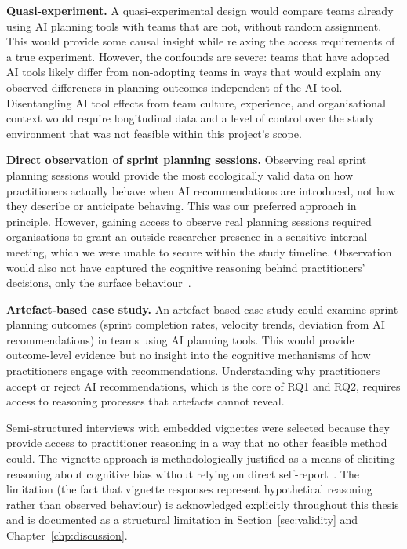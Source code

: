 \documentclass[a4paper,twoside]{bth}
\begin{document}
\textbf{Quasi-experiment.} A quasi-experimental design would compare teams already using AI planning tools with teams that are not, without random assignment. This would provide some causal insight while relaxing the access requirements of a true experiment. However, the confounds are severe: teams that have adopted AI tools likely differ from non-adopting teams in ways that would explain any observed differences in planning outcomes independent of the AI tool. Disentangling AI tool effects from team culture, experience, and organisational context would require longitudinal data and a level of control over the study environment that was not feasible within this project's scope.

\textbf{Direct observation of sprint planning sessions.} Observing real sprint planning sessions would provide the most ecologically valid data on how practitioners actually behave when AI recommendations are introduced, not how they describe or anticipate behaving. This was our preferred approach in principle. However, gaining access to observe real planning sessions required organisations to grant an outside researcher presence in a sensitive internal meeting, which we were unable to secure within the study timeline. Observation would also not have captured the cognitive reasoning behind practitioners' decisions, only the surface behaviour~\cite{nisbett1977telling}.

\textbf{Artefact-based case study.} An artefact-based case study could examine sprint planning outcomes (sprint completion rates, velocity trends, deviation from AI recommendations) in teams using AI planning tools. This would provide outcome-level evidence but no insight into the cognitive mechanisms of how practitioners engage with recommendations. Understanding why practitioners accept or reject AI recommendations, which is the core of RQ1 and RQ2, requires access to reasoning processes that artefacts cannot reveal.

Semi-structured interviews with embedded vignettes were selected because they provide access to practitioner reasoning in a way that no other feasible method could. The vignette approach is methodologically justified as a means of eliciting reasoning about cognitive bias without relying on direct self-report~\cite{aguinis2014best}. The limitation (the fact that vignette responses represent hypothetical reasoning rather than observed behaviour) is acknowledged explicitly throughout this thesis and is documented as a structural limitation in Section~\ref{sec:validity} and Chapter~\ref{chp:discussion}.
\end{document}

